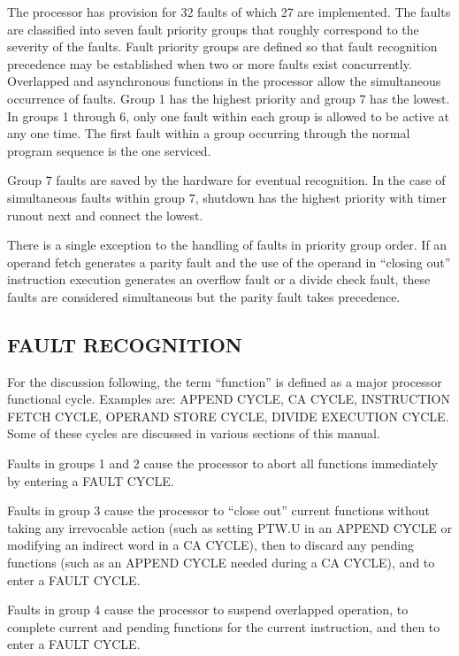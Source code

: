 The processor has provision for 32 faults of which 27 are implemented. The
faults are classified into seven fault priority groups that roughly correspond
to the severity of the faults.  Fault priority groups are defined so that fault
recognition precedence may be established when two or more faults exist
concurrently. Overlapped and asynchronous functions in the processor allow the
simultaneous occurrence of faults. Group 1 has the highest priority and group 7
has the lowest. In groups 1 through 6, only one fault within each group is
allowed to be active at any one time. The first fault within a group occurring
through the normal program sequence is the one serviced.


Group 7 faults are saved by the hardware for eventual recognition. In the case
of simultaneous faults within group 7, shutdown has the highest priority with
timer runout next and connect the lowest.

There is a single exception to the handling of faults in priority group order.
If an operand fetch generates a parity fault and the use of the operand in
{``}closing out'' instruction execution generates an overflow fault or a divide
check fault, these faults are considered simultaneous but the parity fault
takes precedence.

\subsection{FAULT RECOGNITION}

For the discussion following, the term {``}function'' is defined as a major
processor functional cycle. Examples are: APPEND CYCLE, CA CYCLE, INSTRUCTION
FETCH CYCLE, OPERAND STORE CYCLE, DIVIDE EXECUTION CYCLE. Some of these cycles
are discussed in various sections of this manual.

Faults in groups 1 and 2 cause the processor to abort all functions immediately by entering a FAULT CYCLE.

Faults in group 3 cause the processor to {``}close out'' current functions
without taking any irrevocable action (such as setting PTW.U in an APPEND CYCLE
or modifying an indirect word in a CA CYCLE), then to discard any pending
functions (such as an APPEND CYCLE needed during a CA CYCLE), and to enter a
FAULT CYCLE.

Faults in group 4 cause the processor to suspend overlapped operation, to
complete current and pending functions for the current instruction, and then to
enter a FAULT CYCLE.  

